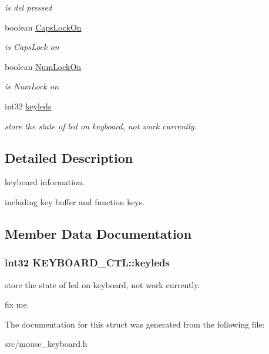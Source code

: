 \begin{DoxyCompactItemize}
\begin{DoxyCompactList}\small\item\em is del pressed \end{DoxyCompactList}\item 
\hypertarget{struct_k_e_y_b_o_a_r_d___c_t_l_a3f14bdefabbade76c850ae122d4372f5}{}boolean \hyperlink{struct_k_e_y_b_o_a_r_d___c_t_l_a3f14bdefabbade76c850ae122d4372f5}{Caps\+Lock\+On}\label{struct_k_e_y_b_o_a_r_d___c_t_l_a3f14bdefabbade76c850ae122d4372f5}

\begin{DoxyCompactList}\small\item\em is Caps\+Lock on \end{DoxyCompactList}\item 
\hypertarget{struct_k_e_y_b_o_a_r_d___c_t_l_ac60ca960d196586e885bcb644b5b85c7}{}boolean \hyperlink{struct_k_e_y_b_o_a_r_d___c_t_l_ac60ca960d196586e885bcb644b5b85c7}{Num\+Lock\+On}\label{struct_k_e_y_b_o_a_r_d___c_t_l_ac60ca960d196586e885bcb644b5b85c7}

\begin{DoxyCompactList}\small\item\em is Num\+Lock on \end{DoxyCompactList}\item 
int32 \hyperlink{struct_k_e_y_b_o_a_r_d___c_t_l_a51fe2b8c11446492ddb451113bbb2ef2}{keyleds}
\begin{DoxyCompactList}\small\item\em store the state of led on keyboard, not work currently. \end{DoxyCompactList}\end{DoxyCompactItemize}


\subsection{Detailed Description}
keyboard information. 

including key buffer and function keys. 

\subsection{Member Data Documentation}
\hypertarget{struct_k_e_y_b_o_a_r_d___c_t_l_a51fe2b8c11446492ddb451113bbb2ef2}{}
\subsubsection[{keyleds}]{\setlength{\rightskip}{0pt plus 5cm}int32 K\+E\+Y\+B\+O\+A\+R\+D\+\_\+\+C\+T\+L\+::keyleds}\label{struct_k_e_y_b_o_a_r_d___c_t_l_a51fe2b8c11446492ddb451113bbb2ef2}


store the state of led on keyboard, not work currently. 

fix me. 

The documentation for this struct was generated from the following file\+:\begin{DoxyCompactItemize}
\item 
src/mouse\+\_\+keyboard.\+h\end{DoxyCompactItemize}

